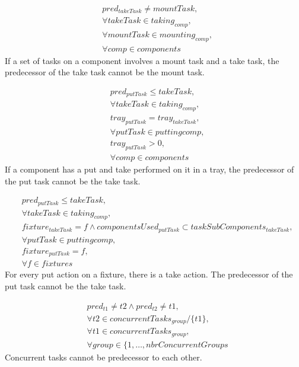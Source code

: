 \documentclass[10pt,a4paper]{report}
\begin{document}
\begin{equation}
\begin{aligned}\label{eq:85}
&pred_{takeTask} \neq mountTask, \\
&\forall takeTask \in taking_{comp}, \\
&\forall mountTask \in mounting_{comp}, \\
&\forall comp \in components
\end{aligned}
\end{equation}
If a set of tasks on a component involves a mount task and a take task, the predecessor of the take task cannot be the mount task.


\begin{equation}
\begin{aligned}\label{eq:86}
&pred_{putTask} \le takeTask, \\
&\forall takeTask \in taking_{comp}, \\
&tray_{putTask} = tray_{takeTask}, \\
&\forall putTask \in putting{comp}, \\
&tray_{putTask} > 0, \\
&\forall comp \in components
\end{aligned}
\end{equation}
If a component has a put and take performed on it in a tray, the predecessor of the put task cannot be the take task.


\begin{equation}
\begin{aligned}\label{eq:87}
&pred_{putTask} \le takeTask, \\
&\forall takeTask \in taking_{comp}, \\
&fixture_{takeTask} = f \land componentsUsed_{putTask} \subset taskSubComponents_{takeTask}, \\
&\forall putTask \in putting{comp}, \\
&fixture_{putTask} = f, \\
&\forall f \in fixtures
\end{aligned}
\end{equation}
For every put action on a fixture, there is a take action. The predecessor of the put task cannot be the take task.

\begin{equation}
\begin{aligned}\label{eq:88}
&pred_{t1} \neq t2 \land pred_{t2} \neq t1, \\
&\forall t2 \in concurrentTasks_{group} / \{t1\}, \\
&\forall t1 \in concurrentTasks_{group}, \\
&\forall group \in \{1 , \ldots , nbrConcurrentGroups
\end{aligned}
\end{equation}
Concurrent tasks cannot be predecessor to each other.
\end{document}
